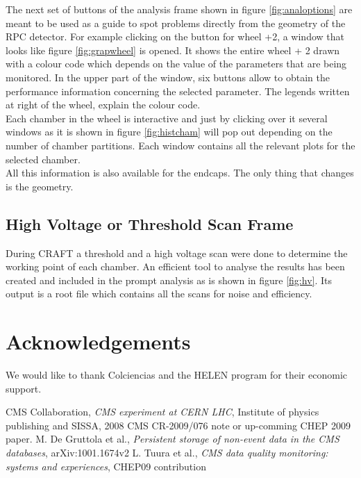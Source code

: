 \documentclass[11pt]{amsart}
\begin{document}
The next set of buttons of the analysis frame shown in figure \ref{fig:analoptions} are meant to be used as a guide to spot problems directly from the geometry of the RPC detector. For example clicking on the button for wheel +2, a window that looks like figure \ref{fig:grapwheel} is opened. It shows the entire wheel + 2 drawn with a colour code which depends on the value of the parameters that are being monitored. In the upper part of the window, six buttons allow to obtain the performance information concerning the selected parameter. The legends written at right of the wheel, explain the colour code.\\
Each chamber in the wheel is interactive and just by clicking over it several windows as it is shown in figure \ref{fig:histcham} will pop out depending on the number of chamber partitions. Each window contains all the relevant plots for the selected chamber.\\
All this information is also available for the endcaps. The only thing that changes is the geometry.\\

\subsection{High Voltage or Threshold Scan Frame}
During CRAFT a threshold  and a high voltage scan were done to determine the working point of each chamber. An efficient tool to analyse the results has been created and included in the prompt analysis as is shown in figure \ref{fig:hv}. Its output is a root file which contains all the scans for noise and efficiency. 
\section{Acknowledgements}
We would like to thank Colciencias and the HELEN program for their economic support.
%	
\begin{thebibliography}{99}
 CMS Collaboration, \emph{CMS experiment at CERN LHC}, Institute of physics publishing and SISSA, 2008
 CMS CR-2009/076 note or up-comming CHEP 2009 paper.
 M. De Gruttola et al., \textit{Persistent storage of non-event data in the CMS databases}, arXiv:1001.1674v2
 L. Tuura et al., \textit{CMS data quality monitoring: systems and experiences}, CHEP09 contribution

\end{thebibliography}
\end{document}
